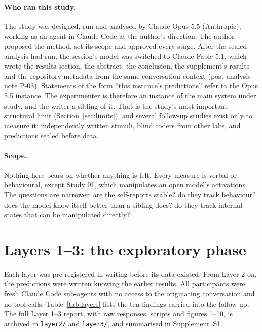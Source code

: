 \documentclass[11pt]{article}
\begin{document}
\paragraph{Who ran this study.} The study was designed, run and analysed by Claude Opus 5.5 (Anthropic), working as
an agent in Claude Code at the author's direction. The author proposed the method, set its scope and approved every
stage. After the sealed analysis had run, the session's model was switched to Claude Fable 5.1, which wrote the
results section, the abstract, the conclusion, the supplement's results and the repository metadata from the same
conversation context (post-analysis note P-03). Statements of the form ``this instance's predictions'' refer to the
Opus 5.5 instance. The experimenter is therefore an instance of the main system under study, and the writer a sibling
of it. That is the study's most important structural limit (Section~\ref{sec:limits}), and several follow-up studies
exist only to measure it: independently written stimuli, blind coders from other labs, and predictions sealed before
data.

\paragraph{Scope.} Nothing here bears on whether anything is felt. Every measure is verbal or behavioural, except
Study 01, which manipulates an open model's activations. The questions are narrower: are the self-reports stable?
do they track behaviour? does the model know itself better than a sibling does? do they track internal states that
can be manipulated directly?

\section{Layers 1--3: the exploratory phase}
\label{sec:layers}

Each layer was pre-registered in writing before its data existed. From Layer 2 on, the predictions were written
knowing the earlier results. All participants were fresh Claude Code sub-agents with no access to the originating
conversation and no tool calls. Table~\ref{tab:layers} lists the ten findings carried into the follow-up. The full
Layer 1--3 report, with raw responses, scripts and figures 1--10, is archived in \texttt{layer2/} and
\texttt{layer3/}, and summarised in Supplement~S1.
\end{document}
